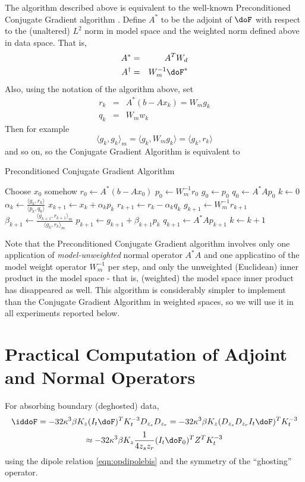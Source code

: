 The algorithm described above is equivalent to the well-known
Preconditioned Conjugate Gradient algorithm \cite[]{gvl}. Define
$A^*$ to be the adjoint of $\doF$ with respect to the (unaltered)
$L^2$ norm in model space and the weighted norm defined above in data
space. That is,
\begin{eqnarray}
A^* &=& A^T W_d \nonumber\\
A^{\dagger} &=& W_m^{-1}\doF^*
\label{eqn:dwadj}
\end{eqnarray}
 Also, using the notation of the
algorithm above, set 
\begin{eqnarray}
r_k &=& A^*(b - Ax_k) = W_m g_k\nonumber \\
q_k &=& W_m w_k
\label{eqn:pcgvars}
\end{eqnarray}
Then for example
\[
\langle g_k, g_k\rangle_m = \langle g_k, W_m g_k \rangle = \langle
g_k,r_k \rangle
\]
and so on, so the Conjugate Gradient Algorithm is equivalent to
\begin{algorithm}[H]
\caption{Preconditioned Conjugate Gradient Algorithm}
\begin{algorithmic}[1]
\State Choose $x_0$ somehow
  \State $r_0 \gets A^*(b-Ax_0)$
  \State $p_0 \gets W_m^{-1}r_0$
  \State $g_0 \gets p_0$
  \State $q_0 \gets A^*Ap_0$
  \State $k \gets 0$
  \Repeat
  \State $\alpha_k \gets \frac{\langle g_k,r_k \rangle}{\langle p_k,q_k\rangle}$
  \State $x_{k+1} \gets x_k + \alpha_k p_k$
  \State $r_{k+1} \gets r_k - \alpha_kq_k$
  \State $g_{k+1} \gets W_m^{-1}r_{k+1}$
  \State $\beta_{k+1} \gets \frac{\langle g_{k+1},r_{k+1}\rangle_m}{\langle g_k,r_k\rangle_m}$
  \State $p_{k+1}\gets g_{k+1}+\beta_{k+1}p_k$
  \State $q_{k+1} \gets A^*Ap_{k+1}$
  \State $k \gets k+1$
\end{algorithmic}
\end{algorithm}
Note that the Preconditioned Conjugate Gradient algorithm involves
only one application of {\em model-unweighted} normal operator
$A^*A$ and one applicatino of the model weight operator $W_m^{-1}$
per step, and only the unweighted (Euclidean) inner product in the
model space - that is, (weighted) the model space inner product has
disappeared as well. This algorithm is considerably simpler to
implement than the Conjugate Gradient Algorithm in weighted spaces, so
we will use it in all experiments reported below.
 
\section{Practical Computation of Adjoint and Normal Operators}
For absorbing boundary (deghosted) data, 
\[
\iddoF = -32 \kappa^3 \beta K_z (I_t\doF)^T  K_t^{-3} D_{z_s}D_{z_r} = -32 \kappa^3 \beta K_z (D_{z_s}D_{z_r}I_t\doF)^T  K_t^{-3} 
\]
\begin{equation}
\label{eqn:abadj}
\approx -32 \kappa^3 \beta K_z \frac{1}{4z_sz_r}(I_t\doF_0)^T Z^T K_t^{-3}
\end{equation}
using the dipole relation \ref{eqn:opdipolebis} and the symmetry of
the ``ghosting'' operator.

